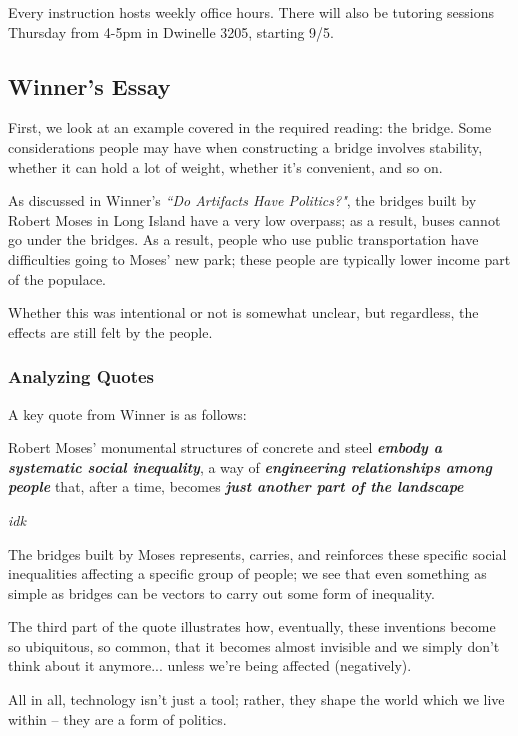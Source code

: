 \documentclass[openany]{book}
\begin{document}
Every instruction hosts weekly office hours. There will also be tutoring sessions Thursday from 4-5pm in Dwinelle 3205, starting 9/5.

\subsection{Winner's Essay}
First, we look at an example covered in the required reading: the bridge. Some considerations people may have when constructing a bridge involves stability, whether it can hold a lot of weight, whether it's convenient, and so on.

As discussed in Winner's \textit{``Do Artifacts Have Politics?"}, the bridges built by Robert Moses in Long Island have a very low overpass; as a result, buses cannot go under the bridges. As a result, people who use public transportation have difficulties going to Moses' new park; these people are typically lower income part of the populace.

Whether this was intentional or not is somewhat unclear, but regardless, the effects are still felt by the people.

\subsubsection{Analyzing Quotes}
A key quote from Winner is as follows:

\begin{fancyquotes}
	Robert Moses' monumental structures of concrete and steel \textbf{\textit{embody a systematic social inequality}}, a way of \textbf{\textit{engineering relationships among people}} that, after a time, becomes \textbf{\textit{just another part of the landscape}}
	
	\begin{flushright}
		\emph{idk}
	\end{flushright}
\end{fancyquotes}

The bridges built by Moses represents, carries, and reinforces these specific social inequalities affecting a specific group of people; we see that even something as simple as bridges can be vectors to carry out some form of inequality.

The third part of the quote illustrates how, eventually, these inventions become so ubiquitous, so common, that it becomes almost invisible and we simply don't think about it anymore... unless we're being affected (negatively).

All in all, technology isn't just a tool; rather, they shape the world which we live within -- they are a form of politics.
\end{document}
